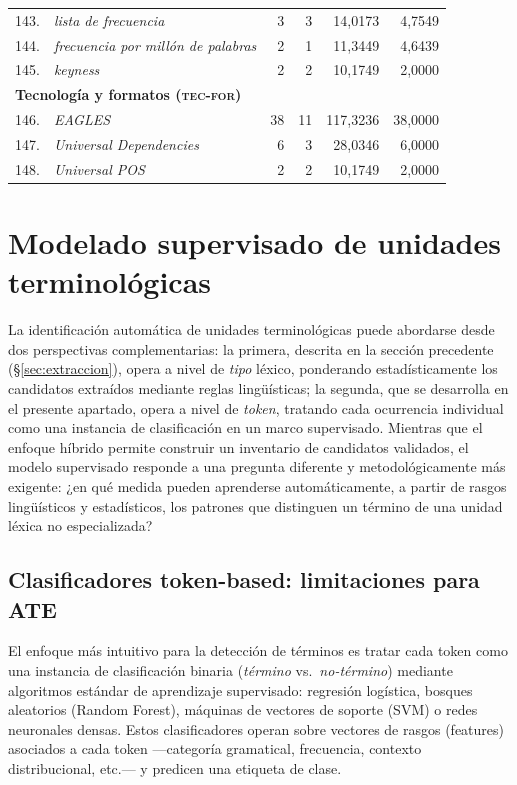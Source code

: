 \begin{longtable}{@{} r p{5cm} r r r r @{}}
143. & \textit{lista de frecuencia} & 3 & 3 & 14{,}0173 & 4{,}7549 \\
144. & \textit{frecuencia por millón de palabras} & 2 & 1 & 11{,}3449 & 4{,}6439 \\
145. & \textit{keyness} & 2 & 2 & 10{,}1749 & 2{,}0000 \\
\midrule
\multicolumn{6}{l}{\textbf{Tecnología y formatos (\textsc{tec-for})}} \\
\midrule
146. & \textit{EAGLES} & 38 & 11 & 117{,}3236 & 38{,}0000 \\
147. & \textit{Universal Dependencies} & 6 & 3 & 28{,}0346 & 6{,}0000 \\
148. & \textit{Universal POS} & 2 & 2 & 10{,}1749 & 2{,}0000 \\
\end{longtable}
\normalsize


\section{Modelado supervisado de unidades terminológicas}
\label{sec:modelo_tc}

La identificación automática de unidades terminológicas puede abordarse desde dos perspectivas complementarias: la primera, descrita en la sección precedente (§\ref{sec:extraccion}), opera a nivel de \emph{tipo} léxico, ponderando estadísticamente los candidatos extraídos mediante reglas lingüísticas; la segunda, que se desarrolla en el presente apartado, opera a nivel de \emph{token}, tratando cada ocurrencia individual como una instancia de clasificación en un marco supervisado. Mientras que el enfoque híbrido permite construir un inventario de candidatos validados, el modelo supervisado responde a una pregunta diferente y metodológicamente más exigente: ¿en qué medida pueden aprenderse automáticamente, a partir de rasgos lingüísticos y estadísticos, los patrones que distinguen un término de una unidad léxica no especializada?

\subsection{Clasificadores token-based: limitaciones para ATE}
\label{subsec:clasificadores_tokenbase}

El enfoque más intuitivo para la detección de términos es tratar cada token como una instancia de clasificación binaria (\textit{término} vs.\ \textit{no-término}) mediante algoritmos estándar de aprendizaje supervisado: regresión logística, bosques aleatorios (Random Forest), máquinas de vectores de soporte (SVM) o redes neuronales densas. Estos clasificadores operan sobre vectores de rasgos (features) asociados a cada token ---categoría gramatical, frecuencia, contexto distribucional, etc.--- y predicen una etiqueta de clase.

